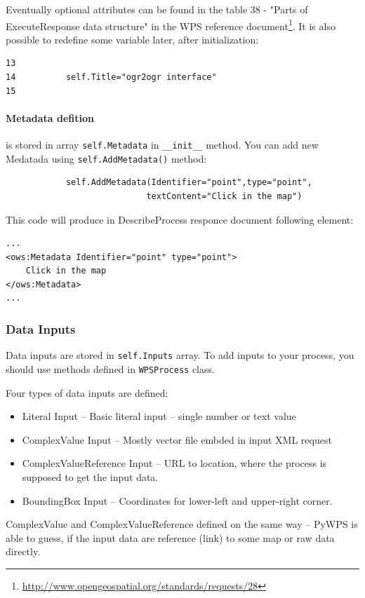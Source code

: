 \documentclass[a4paper,11pt]{article}
\begin{document}
Eventually optional attributes can be found in the table 38 - "Parts of
ExecuteResponse data structure" in the WPS reference
document\footnote{\url{http://www.opengeospatial.org/standards/requests/28}}. It is also possible to redefine some
variable later, after initialization:

\begin{verbatim}
13
14          self.Title="ogr2ogr interface"
15
\end{verbatim}


\paragraph{Metadata defition} is stored in array \texttt{self.Metadata} in
\texttt{\_\_init\_\_} method. You can add new Medatada using
\texttt{self.AddMetadata()} method:
\begin{verbatim}
            self.AddMetadata(Identifier="point",type="point",
                            textContent="Click in the map")
\end{verbatim}

This code will produce in DescribeProcess responce document following
element:
\begin{verbatim}
...
<ows:Metadata Identifier="point" type="point">
    Click in the map
</ows:Metadata>
...
\end{verbatim}

\subsubsection{Data Inputs}
Data inputs are stored in \texttt{self.Inputs} array. To add inputs to
your process, you should use methods defined in \texttt{WPSProcess} class.

Four types of data inputs are defined:
\begin{itemize}
    \item Literal Input -- Basic literal input -- single number or text
    value
    \item ComplexValue Input  -- Mostly vector file embded in input XML
    request
    \item ComplexValueReference Input -- URL to location, where the process
    is supposed to get the input data.
    \item BoundingBox Input -- Coordinates for lower-left and upper-right
    corner.
\end{itemize}

ComplexValue and ComplexValueReference defined on the same way -- PyWPS is
able to guess, if the input data are reference (link) to some map or raw
data directly.
\end{document}
